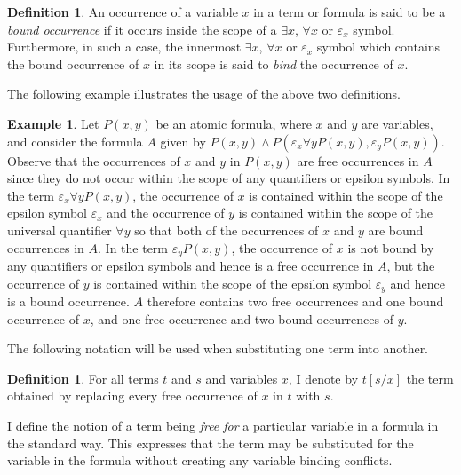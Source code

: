 \documentclass[10pt]{article}
\theoremstyle{definition}\newtheorem{remark}[theorem]{Remark}
\theoremstyle{definition}\newtheorem{example}[theorem]{Example}
\theoremstyle{definition}\newtheorem{definition}[theorem]{Definition}
\begin{document}
	\begin{definition}\label{BoundDefn}
		An occurrence of a variable $x$ in a term or formula is said to be a \textit{bound occurrence} if it occurs inside the scope of a $\exists x$, $\forall x$ or $\varepsilon_x$ symbol. Furthermore, in such a case, the innermost $\exists x$, $\forall x$ or $\varepsilon_x$ symbol which contains the bound occurrence of $x$ in its scope is said to \textit{bind} the occurrence of $x$.
	\end{definition}

	The following example illustrates the usage of the above two definitions.

	\begin{example}
		Let $P(x, y)$ be an atomic formula, where $x$ and $y$ are variables, and consider the formula $A$ given by $P(x, y) \land P(\varepsilon_x \forall y P(x, y), \varepsilon_y P(x, y))$. Observe that the occurrences of $x$ and $y$ in $P(x, y)$ are free occurrences in $A$ since they do not occur within the scope of any quantifiers or epsilon symbols. In the term $\varepsilon_x \forall y P(x, y)$, the occurrence of $x$ is contained within the scope of the epsilon symbol $\varepsilon_x$ and the occurrence of $y$ is contained within the scope of the universal quantifier $\forall y$ so that both of the occurrences of $x$ and $y$ are bound occurrences in $A$. In the term $\varepsilon_y P(x, y)$, the occurrence of $x$ is not bound by any quantifiers or epsilon symbols and hence is a free occurrence in $A$, but the occurrence of $y$ is contained within the scope of the epsilon symbol $\varepsilon_y$ and hence is a bound occurrence. $A$ therefore contains two free occurrences and one bound occurrence of $x$, and one free occurrence and two bound occurrences of $y$.
	\end{example}

	The following notation will be used when substituting one term into another.

	\begin{definition}
		For all terms $t$ and $s$ and variables $x$, I denote by $t [s / x]$ the term obtained by replacing every free occurrence of $x$ in $t$ with $s$.
	\end{definition}

	I define the notion of a term being \textit{free for} a particular variable in a formula in the standard way. This expresses that the term may be substituted for the variable in the formula without creating any variable binding conflicts.
	
\end{document}
